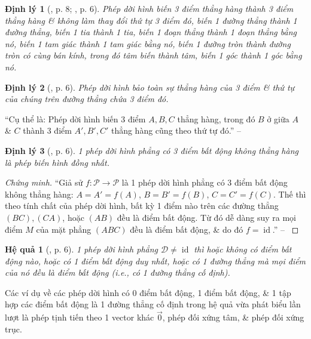 \documentclass[oneside]{book}
\numberwithin{equation}{section}
\newtheorem{hequa}{Hệ quả}[section]
\newtheorem{dinhly}{Định lý}[section]
\begin{document}
\begin{dinhly}[\cite{SGK_Toan_11_hinh_hoc_nang_cao}, p. 8; \cite{TL_chuyen_Toan_Hinh_Hoc_11}, p. 6]
	Phép dời hình biến 3 điểm thẳng hàng thành 3 điểm thẳng hàng \& không làm thay đổi thứ tự 3 điểm đó, biến 1 đường thẳng thành 1 đường thẳng, biến 1 tia thành 1 tia, biến 1 đoạn thẳng thành 1 đoạn thẳng bằng nó, biến 1 tam giác thành 1 tam giác bằng nó, biến 1 đường tròn thành đường tròn có cùng bán kính, trong đó tâm biến thành tâm, biến 1 góc thành 1 góc bằng nó.
\end{dinhly}

\begin{dinhly}[\cite{TL_chuyen_Toan_Hinh_Hoc_11}, p. 6]
	Phép dời hình bảo toàn sự thẳng hàng của 3 điểm \& thứ tự của chúng trên đường thẳng chứa 3 điểm đó.
\end{dinhly}
``Cụ thể là: Phép dời hình biến 3 điểm $A,B,C$ thẳng hàng, trong đó $B$ ở giữa $A$ \& $C$ thành 3 điểm $A',B',C'$ thẳng hàng cũng theo thứ tự đó.'' -- \cite[p. 6]{TL_chuyen_Toan_Hinh_Hoc_11}

\begin{dinhly}[\cite{TL_chuyen_Toan_Hinh_Hoc_11}, p. 6]
	1 phép dời hình phẳng có 3 điểm bất động không thẳng hàng là phép biến hình đồng nhất.
\end{dinhly}

\begin{proof}[Chứng minh]
	``Giả sử $f:\mathcal{P}\to\mathcal{P}$ là 1 phép dời hình phẳng có 3 điểm bất động không thẳng hàng: $A = A' = f(A)$, $B = B' = f(B)$, $C = C' = f(C)$. Thế thì theo tính chất của phép dời hình, bất kỳ 1 điểm nào trên các đường thẳng $(BC),(CA)$, hoặc $(AB)$ đều là điểm bất động. Từ đó dễ dàng suy ra mọi điểm $M$ của mặt phẳng $(ABC)$ đều là điểm bất động, \& do đó $f = \operatorname{id}$.'' -- \cite[p. 6]{TL_chuyen_Toan_Hinh_Hoc_11}
\end{proof}

\begin{hequa}[\cite{TL_chuyen_Toan_Hinh_Hoc_11}, p. 6]
	1 phép dời hình phẳng $\mathcal{D}\ne\operatorname{id}$ thì hoặc không có điểm bất động nào, hoặc có 1 điểm bất động duy nhất, hoặc có 1 đường thẳng mà mọi điểm của nó đều là điểm bất động (i.e., có 1 đường thẳng cố định).
\end{hequa}
Các ví dụ về các phép dời hình có 0 điểm bất động, 1 điểm bất động, \& 1 tập hợp các điểm bất động là 1 đường thẳng cố định trong hệ quả vừa phát biểu lần lượt là phép tịnh tiến theo 1 vector khác $\vec{0}$, phép đối xứng tâm, \& phép đối xứng trục.
\end{document}
